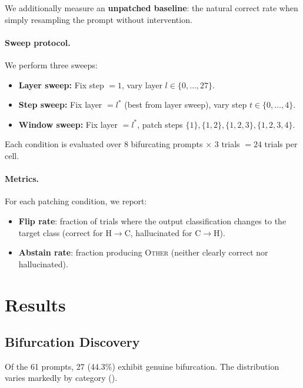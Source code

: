 \documentclass[11pt,a4paper]{article}
\begin{document}
We additionally measure an \textbf{unpatched baseline}: the natural correct rate when simply resampling the prompt without intervention.

\paragraph{Sweep protocol.} We perform three sweeps:

\begin{itemize}
    \item \textbf{Layer sweep:} Fix step $= 1$, vary layer $l \in \{0, \ldots, 27\}$.
    \item \textbf{Step sweep:} Fix layer $= l^*$ (best from layer sweep), vary step $t \in \{0, \ldots, 4\}$.
    \item \textbf{Window sweep:} Fix layer $= l^*$, patch steps $\{1\}, \{1,2\}, \{1,2,3\}, \{1,2,3,4\}$.
\end{itemize}

Each condition is evaluated over 8 bifurcating prompts $\times$ 3 trials $= 24$ trials per cell.

\paragraph{Metrics.} For each patching condition, we report:
\begin{itemize}
    \item \textbf{Flip rate}: fraction of trials where the output classification changes to the target class (correct for H$\to$C, hallucinated for C$\to$H).
    \item \textbf{Abstain rate}: fraction producing \textsc{Other} (neither clearly correct nor hallucinated).
\end{itemize}

\section{Results}

\subsection{Bifurcation Discovery}

Of the 61 prompts, 27 (44.3\%) exhibit genuine bifurcation. The distribution varies markedly by category ().
\end{document}
